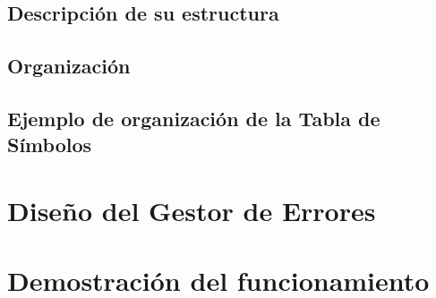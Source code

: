 \documentclass{article}
\begin{document}
\subsection{Descripción de su estructura}


\subsection{Organización}


\subsection{Ejemplo de organización de la Tabla de Símbolos}


\section{Diseño del Gestor de Errores}

\section{Demostración del funcionamiento}

\newpage

\newpage
\end{document}
